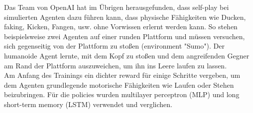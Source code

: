 Das Team von OpenAI hat im Übrigen herausgefunden, dass self-play bei simulierten Agenten dazu führen kann, dass physische Fähigkeiten wie Ducken, faking, Kicken, Fangen, usw. ohne Vorwissen erlernt werden kann. So stehen beispielsweise zwei Agenten auf einer runden Plattform und müssen versuchen, sich gegenseitig von der Plattform zu stoßen (environment "Sumo"). Der humanoide Agent lernte, mit dem Kopf zu stoßen und dem angreifenden Gegner am Rand der Plattform auszuweichen, um ihn ins Leere laufen zu lassen.\\
Am Anfang des Trainings ein dichter reward  für einige Schritte vergeben, um dem Agenten grundlegende motorische Fähigkeiten wie Laufen oder Stehen beizubringen. Für die policies wurden multilayer perceptron (MLP) und long short-term memory (LSTM) verwendet und verglichen.





